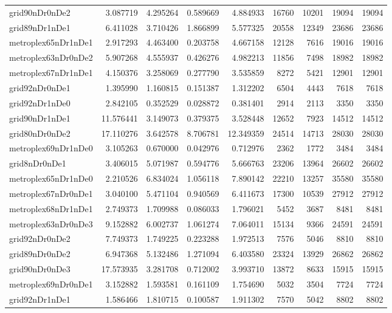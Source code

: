 \begin{longtable}{|l|r|r|r|r|r|r|r|r|}
grid90nDr0nDe2 & 3.087719 & 4.295264 & 0.589669 & 4.884933 & 16760 & 10201 & 19094 & 19094 \\
grid89nDr1nDe1 & 6.411028 & 3.710426 & 1.866899 & 5.577325 & 20558 & 12349 & 23686 & 23686 \\
metroplex65nDr1nDe1 & 2.917293 & 4.463400 & 0.203758 & 4.667158 & 12128 & 7616 & 19016 & 19016 \\
metroplex63nDr0nDe2 & 5.907268 & 4.555937 & 0.426276 & 4.982213 & 11856 & 7498 & 18982 & 18982 \\
metroplex67nDr1nDe1 & 4.150376 & 3.258069 & 0.277790 & 3.535859 & 8272 & 5421 & 12901 & 12901 \\
grid92nDr0nDe1 & 1.395990 & 1.160815 & 0.151387 & 1.312202 & 6504 & 4443 & 7618 & 7618 \\
grid92nDr1nDe0 & 2.842105 & 0.352529 & 0.028872 & 0.381401 & 2914 & 2113 & 3350 & 3350 \\
grid90nDr1nDe1 & 11.576441 & 3.149073 & 0.379375 & 3.528448 & 12652 & 7923 & 14512 & 14512 \\
grid80nDr0nDe2 & 17.110276 & 3.642578 & 8.706781 & 12.349359 & 24514 & 14713 & 28030 & 28030 \\
metroplex69nDr1nDe0 & 3.105263 & 0.670000 & 0.042976 & 0.712976 & 2362 & 1772 & 3484 & 3484 \\
grid8nDr0nDe1 & 3.406015 & 5.071987 & 0.594776 & 5.666763 & 23206 & 13964 & 26602 & 26602 \\
metroplex65nDr1nDe0 & 2.210526 & 6.834024 & 1.056118 & 7.890142 & 22210 & 13257 & 35580 & 35580 \\
metroplex67nDr0nDe1 & 3.040100 & 5.471104 & 0.940569 & 6.411673 & 17300 & 10539 & 27912 & 27912 \\
metroplex68nDr1nDe1 & 2.749373 & 1.709988 & 0.086033 & 1.796021 & 5452 & 3687 & 8481 & 8481 \\
metroplex63nDr0nDe3 & 9.152882 & 6.002737 & 1.061274 & 7.064011 & 15134 & 9366 & 24591 & 24591 \\
grid92nDr0nDe2 & 7.749373 & 1.749225 & 0.223288 & 1.972513 & 7576 & 5046 & 8810 & 8810 \\
grid89nDr0nDe2 & 6.947368 & 5.132486 & 1.271094 & 6.403580 & 23324 & 13929 & 26862 & 26862 \\
grid90nDr0nDe3 & 17.573935 & 3.281708 & 0.712002 & 3.993710 & 13872 & 8633 & 15915 & 15915 \\
metroplex69nDr0nDe1 & 3.152882 & 1.593581 & 0.161109 & 1.754690 & 5032 & 3504 & 7724 & 7724 \\
grid92nDr1nDe1 & 1.586466 & 1.810715 & 0.100587 & 1.911302 & 7570 & 5042 & 8802 & 8802 \\

\end{longtable}
